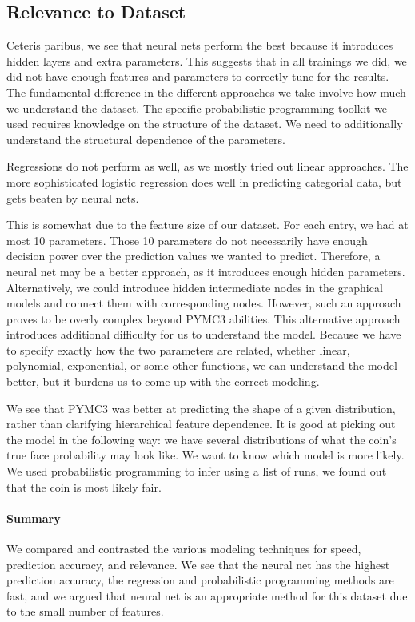 \documentclass[]{article}
\begin{document}
\subsection{Relevance to Dataset}
Ceteris paribus, we see that neural nets perform the best because it introduces hidden layers and extra parameters. This suggests that in all trainings we did, we did not have enough features and parameters to correctly tune for the results. The fundamental difference in the different approaches we take involve how much we understand the dataset. The specific probabilistic programming toolkit we used requires knowledge on the structure of the dataset. We need to additionally understand the structural dependence of the parameters.

Regressions do not perform as well, as we mostly tried out linear approaches. The more sophisticated logistic regression does well in predicting categorial data, but gets beaten by neural nets.

This is somewhat due to the feature size of our dataset. For each entry, we had at most 10 parameters. Those 10 parameters do not necessarily have enough decision power over the prediction values we wanted to predict. Therefore, a neural net may be a better approach, as it introduces enough hidden parameters. Alternatively, we could introduce hidden intermediate nodes in the graphical models and connect them with corresponding nodes. However, such an approach proves to be overly complex beyond PYMC3 abilities. This alternative approach introduces additional difficulty for us to understand the model. Because we have to specify exactly how the two parameters are related, whether linear, polynomial, exponential, or some other functions, we can understand the model better, but it burdens us to come up with the correct modeling. 

We see that PYMC3 was better at predicting the shape of a given distribution, rather than clarifying hierarchical feature dependence. It is good at picking out the model in the following way: we have several distributions of what the coin's true face probability may look like. We want to know which model is more likely. We used probabilistic programming to infer using a list of runs, we found out that the coin is most likely fair.

\paragraph{Summary}

We compared and contrasted the various modeling techniques for speed, prediction accuracy, and relevance. We see that the neural net has the highest prediction accuracy, the regression and probabilistic programming methods are fast, and we argued that neural net is an appropriate method for this dataset due to the small number of features.
\newpage
\end{document}
